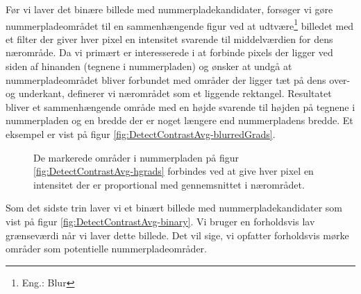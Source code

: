 Før vi laver det binære billede med nummerpladekandidater, forsøger vi gøre nummerpladeområdet til en sammenhængende figur ved at udtvære\footnote{Eng.: Blur} billedet med et filter der giver hver pixel en intensitet svarende til middelværdien for dens nærområde. Da vi primært er interesserede i at forbinde pixels der ligger ved siden af hinanden (tegnene i nummerpladen) og ønsker at undgå at nummerpladeområdet bliver forbundet med områder der ligger tæt på dens over- og underkant, definerer vi nærområdet som et liggende rektangel. Resultatet bliver et sammenhængende område med en højde svarende til højden på tegnene i nummerpladen og en bredde der er noget længere end nummerpladens bredde. Et eksempel er vist på figur \vref{fig:DetectContrastAvg-blurredGrads}. 

\begin{figure}[htp]
  \centering
  \caption{De markerede områder i nummerpladen på figur \vref{fig:DetectContrastAvg-hgrads} forbindes ved at give hver pixel en intensitet der er proportional med gennemsnittet i nærområdet.}
  \label{fig:DetectContrastAvg-blurredGrads}  
\end{figure}


Som det sidste trin laver vi et binært billede med nummerpladekandidater som vist på figur \vref{fig:DetectContrastAvg-binary}. Vi bruger en forholdsvis lav grænseværdi når vi laver dette billede. Det vil sige, vi opfatter forholdsvis mørke områder som potentielle nummerpladeområder.

